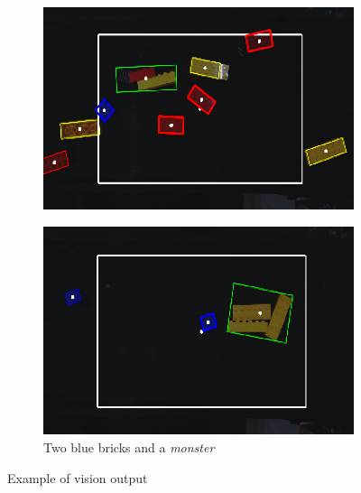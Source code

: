    \begin{figure}[H]
        \centering
        \begin{subfigure}{0.45\textwidth}
            \includegraphics[width=\textwidth]{figs/rc_vision_ex1}
            \caption{}
            \label{fig:rc_vision_ex1}
        \end{subfigure}
        \hspace{10pt}
        \begin{subfigure}{0.45\textwidth}
            \includegraphics[width=\textwidth]{figs/rc_vision_ex2}
            \caption{Two blue bricks and a \textit{monster}}
            \label{fig:rc_vision_ex2}
    \end{subfigure}
    \caption{Example of vision output}
    \end{figure}